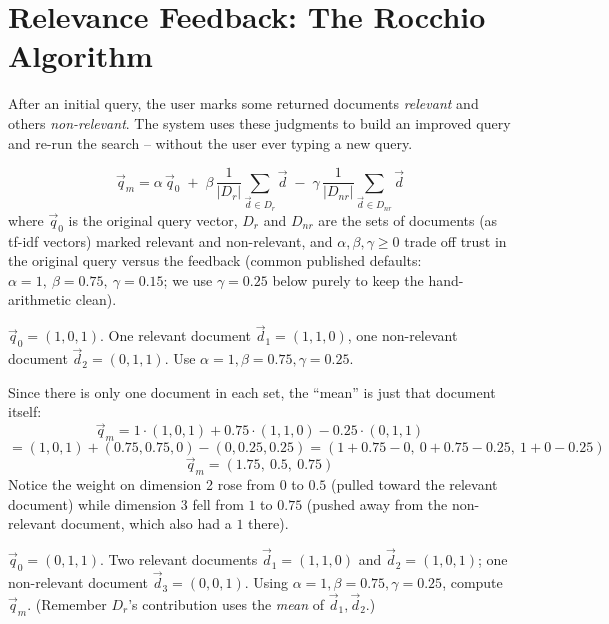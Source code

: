 \documentclass[11pt, a4paper]{article}
\begin{document}
\section{Relevance Feedback: The Rocchio Algorithm}

\begin{defbox}
After an initial query, the user marks some returned documents \emph{relevant} and others \emph{non-relevant}. The system uses these judgments to build an improved query and re-run the search -- without the user ever typing a new query.
\end{defbox}

\begin{formulabox}
\[
\vec q_m = \alpha\, \vec q_0 \;+\; \beta\,\frac{1}{|D_r|}\sum_{\vec d \in D_r} \vec d \;-\; \gamma\,\frac{1}{|D_{nr}|}\sum_{\vec d \in D_{nr}} \vec d
\]
where $\vec q_0$ is the original query vector, $D_r$ and $D_{nr}$ are the sets of documents (as tf-idf vectors) marked relevant and non-relevant, and $\alpha,\beta,\gamma \ge 0$ trade off trust in the original query versus the feedback (common published defaults: $\alpha=1,\ \beta=0.75,\ \gamma=0.15$; we use $\gamma=0.25$ below purely to keep the hand-arithmetic clean).
\end{formulabox}

\begin{examplebox}
$\vec q_0 = (1,0,1)$. One relevant document $\vec d_1=(1,1,0)$, one non-relevant document $\vec d_2=(0,1,1)$. Use $\alpha=1,\beta=0.75,\gamma=0.25$.

Since there is only one document in each set, the ``mean'' is just that document itself:
\[
\vec q_m = 1\cdot(1,0,1) + 0.75\cdot(1,1,0) - 0.25\cdot(0,1,1)
\]
\[
= (1,0,1) + (0.75,0.75,0) - (0,0.25,0.25) = (1+0.75-0,\ 0+0.75-0.25,\ 1+0-0.25)
\]
\[
\vec q_m = (1.75,\ 0.5,\ 0.75)
\]
Notice the weight on dimension 2 rose from $0$ to $0.5$ (pulled toward the relevant document) while dimension 3 fell from $1$ to $0.75$ (pushed away from the non-relevant document, which also had a $1$ there).
\end{examplebox}

\begin{exercisebox}
$\vec q_0=(0,1,1)$. Two relevant documents $\vec d_1=(1,1,0)$ and $\vec d_2=(1,0,1)$; one non-relevant document $\vec d_3=(0,0,1)$. Using $\alpha=1,\beta=0.75,\gamma=0.25$, compute $\vec q_m$. (Remember $D_r$'s contribution uses the \emph{mean} of $\vec d_1,\vec d_2$.)
\end{exercisebox}
\end{document}
